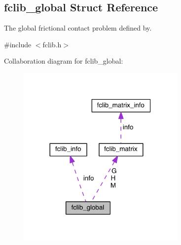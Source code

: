 \hypertarget{structfclib__global}{}\subsection{fclib\+\_\+global Struct Reference}
\label{structfclib__global}


The global frictional contact problem defined by.  




{\ttfamily \#include $<$fclib.\+h$>$}



Collaboration diagram for fclib\+\_\+global\+:\nopagebreak
\begin{figure}[H]
\begin{center}
\leavevmode
\includegraphics[width=233pt]{structfclib__global__coll__graph}
\end{center}
\end{figure}
